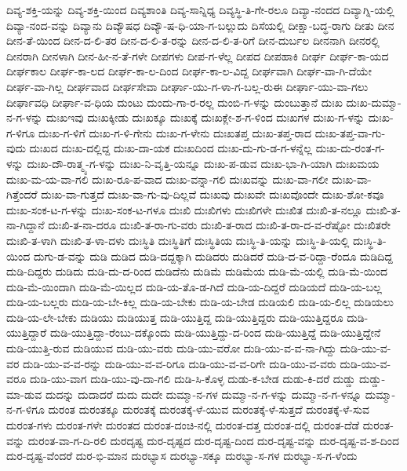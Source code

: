 {ದಿವ್ಯ-ಶಕ್ತಿ-ಯನ್ನು
ದಿವ್ಯ-ಶಕ್ತಿ-ಯಿಂದ
ದಿವ್ಯಶಾಂತಿ
ದಿವ್ಯ-ಸಾನ್ನಿಧ್ಯ
ದಿವ್ಯಸ್ಥಿ-ತಿ-ಗೇ-ರಲೂ
ದಿವ್ಯಾ-ನಂದದ
ದಿವ್ಯಾಗ್ನಿ-ಯಲ್ಲಿ
ದಿವ್ಯಾ-ನಂದ-ವನ್ನು
ದಿವ್ಯಾನು
ದಿವ್ಯೌಷಧ
ದಿವ್ಯೌ-ಷ-ಧಿ-ಯಾ-ಗ-ಬಲ್ಲುದು
ದಿಸೆಯಲ್ಲಿ
ದೀಕ್ಷಾ-ಬದ್ಧ-ರಾಗು
ದೀತು
ದೀನ
ದೀನ-ತೆ-ಯಿಂದ
ದೀನ-ದ-ಲಿ-ತರ
ದೀನ-ದ-ಲಿ-ತ-ರನ್ನು
ದೀನ-ದ-ಲಿ-ತ-ರಿಗೆ
ದೀನ-ದುರ್ಬಲ
ದೀನನಾಗಿ
ದೀನರಲ್ಲಿ
ದೀನರಾಗಿ
ದೀನಳಾಗಿ
ದೀನ-ಹೀ-ನ-ತೆ-ಗಳೇ
ದೀಪಗಳು
ದೀಪ-ಗ-ಳೆಲ್ಲ
ದೀಪದ
ದೀಪಹಾಕಿ
ದೀರ್ಘ
ದೀರ್ಘ-ಕಾ-ಯದ
ದೀರ್ಘಕಾಲ
ದೀರ್ಘ-ಕಾ-ಲದ
ದೀರ್ಘ-ಕಾ-ಲ-ದಿಂದ
ದೀರ್ಘ-ಕಾ-ಲ-ವಿದ್ದ
ದೀರ್ಘವಾಗಿ
ದೀರ್ಘ-ವಾ-ಗಿ-ದೆಯೇ
ದೀರ್ಘ-ವಾ-ಗಿಲ್ಲ
ದೀರ್ಘವಾದ
ದೀರ್ಘಸೇವಾ
ದೀರ್ಘಾ-ಯು-ಗ-ಳಾ-ಗ-ಬಲ್ಲ-ರುಈ
ದೀರ್ಘಾ-ಯು-ವಾ-ಗಲು
ದೀರ್ಘಾವಧಿ
ದೀರ್ಘಾ-ವ-ಧಿಯ
ದುಂಟು
ದುಂದು-ಗಾ-ರ-ರಲ್ಲ
ದುಂಬಿ-ಗ-ಳನ್ನು
ದುಂಬುತ್ತಾನೆ
ದುಃಖ
ದುಃಖ-ದುಮ್ಮಾ-ನ-ಗ-ಳನ್ನು
ದುಃಖಇವು
ದುಃಖಕ್ಕೀಡು
ದುಃಖಕ್ಕೂ
ದುಃಖಕ್ಕೆ
ದುಃಖಕ್ಲೇ-ಶ-ಗ-ಳಿಂದ
ದುಃಖಗಳ
ದುಃಖ-ಗ-ಳನ್ನು
ದುಃಖ-ಗ-ಳಿಗೂ
ದುಃಖ-ಗ-ಳಿಗೆ
ದುಃಖ-ಗ-ಳಿ-ಗೇನು
ದುಃಖ-ಗ-ಳೇನು
ದುಃಖತಪ್ತ
ದುಃಖ-ತಪ್ತ-ರಾದ
ದುಃಖ-ತಪ್ತ-ವಾ-ಗು-ವುದು
ದುಃಖದ
ದುಃಖ-ದಲ್ಲಿದ್ದ
ದುಃಖ-ದಾ-ಯಕ
ದುಃಖದಿಂದ
ದುಃಖ-ದು-ಗು-ಡ-ಗ-ಳನ್ನೆಲ್ಲ
ದುಃಖ-ದು-ರಂತ-ಗ-ಳನ್ನು
ದುಃಖ-ದೌ-ರಾತ್ಮ್ಯ-ಗ-ಳನ್ನು
ದುಃಖ-ನಿ-ವೃತ್ತಿ-ಯನ್ನೂ
ದುಃಖ-ಪ-ಡುವ
ದುಃಖ-ಭಾ-ಗಿ-ಯಾಗಿ
ದುಃಖಮಯ
ದುಃಖ-ಮ-ಯ-ವಾ-ಗಲಿ
ದುಃಖ-ರೂ-ಪ-ವಾದ
ದುಃಖ-ವನ್ನಾ-ಗಲಿ
ದುಃಖವನ್ನು
ದುಃಖ-ವಾ-ಗಲೀ
ದುಃಖ-ವಾ-ಗಿತ್ತೆಂದರೆ
ದುಃಖ-ವಾ-ಗುತ್ತದೆ
ದುಃಖ-ವಾ-ಗು-ವು-ದಿಲ್ಲವೆ
ದುಃಖವು
ದುಃಖವೇ
ದುಃಖವೊಂದೇ
ದುಃಖ-ಶೋ-ಕವೂ
ದುಃಖ-ಸಂಕ-ಟ-ಗ-ಳನ್ನು
ದುಃಖ-ಸಂಕ-ಟ-ಗಳೂ
ದುಃಖಿ
ದುಃಖಿಗಳು
ದುಃಖಿಗಳೇ
ದುಃಖಿತ
ದುಃಖಿ-ತ-ನಲ್ಲೂ
ದುಃಖಿ-ತ-ನಾ-ಗಿದ್ದಾನೆ
ದುಃಖಿ-ತ-ನಾ-ದರೂ
ದುಃಖಿ-ತ-ರಾ-ಗು-ವರು
ದುಃಖಿ-ತ-ರಾದ
ದುಃಖಿ-ತ-ರಾ-ದ-ವ-ರೆಷ್ಟೋ
ದುಃಖಿತರೇ
ದುಃಖಿ-ತ-ಳಾಗಿ
ದುಃಖಿ-ತ-ಳಾ-ದಳು
ದುಃಸ್ಥಿತಿ
ದುಃಸ್ಥಿತಿಗೆ
ದುಃಸ್ಥಿತಿಯ
ದುಃಸ್ಥಿ-ತಿ-ಯನ್ನು
ದುಃಸ್ಥಿ-ತಿ-ಯಲ್ಲಿ
ದುಃಸ್ಥಿ-ತಿ-ಯಿಂದ
ದುಗು-ಡ-ವನ್ನು
ದುಡಿ
ದುಡಿದ
ದುಡಿ-ದದ್ದಕ್ಕಾಗಿ
ದುಡಿದರು
ದುಡಿದರೆ
ದುಡಿ-ದ-ವ-ರಿದ್ದಾ-ರೆಂದೂ
ದುಡಿದಿದ್ದ
ದುಡಿ-ದಿದ್ದರು
ದುಡಿದು
ದುಡಿ-ದು-ದ-ರಿಂದ
ದುಡಿದೆನು
ದುಡಿಮೆ
ದುಡಿಮೆಯ
ದುಡಿ-ಮೆ-ಯಲ್ಲಿ
ದುಡಿ-ಮೆ-ಯಿಂದ
ದುಡಿ-ಮೆ-ಯಿಂದಾಗಿ
ದುಡಿ-ಮೆ-ಯಿಲ್ಲದ
ದುಡಿ-ಯ-ತೊ-ಡ-ಗಿದೆ
ದುಡಿ-ಯ-ದಿದ್ದರೆ
ದುಡಿಯದೆ
ದುಡಿ-ಯ-ಬಲ್ಲ
ದುಡಿ-ಯ-ಬಲ್ಲರು
ದುಡಿ-ಯ-ಬೇ-ಕಿಲ್ಲ
ದುಡಿ-ಯ-ಬೇಕು
ದುಡಿ-ಯ-ಬೇಡ
ದುಡಿಯಲಿ
ದುಡಿ-ಯ-ಲಿಲ್ಲ
ದುಡಿಯಲು
ದುಡಿ-ಯ-ಲೇ-ಬೇಕು
ದುಡಿಯು
ದುಡಿಯುತ್ತ
ದುಡಿ-ಯುತ್ತಿದ್ದ
ದುಡಿ-ಯುತ್ತಿದ್ದರು
ದುಡಿ-ಯುತ್ತಿದ್ದರೂ
ದುಡಿ-ಯುತ್ತಿದ್ದಾರೆ
ದುಡಿ-ಯುತ್ತಿದ್ದಾ-ರೆಂಬು-ದಕ್ಕೊಂದು
ದುಡಿ-ಯುತ್ತಿದ್ದು-ದ-ರಿಂದ
ದುಡಿ-ಯುತ್ತಿದ್ದೆ
ದುಡಿ-ಯುತ್ತಿದ್ದೇನೆ
ದುಡಿ-ಯುತ್ತಿ-ರುವ
ದುಡಿಯುವ
ದುಡಿ-ಯು-ವರು
ದುಡಿ-ಯು-ವರೋ
ದುಡಿ-ಯು-ವ-ವ-ನಾ-ಗಿದ್ದು
ದುಡಿ-ಯು-ವ-ವರ
ದುಡಿ-ಯು-ವ-ವ-ರನ್ನು
ದುಡಿ-ಯು-ವ-ವ-ರಿಗೂ
ದುಡಿ-ಯು-ವ-ವ-ರಿಗೇ
ದುಡಿ-ಯು-ವ-ವರು
ದುಡಿ-ಯು-ವ-ವರೂ
ದುಡಿ-ಯು-ವಾಗ
ದುಡಿ-ಯು-ವು-ದಾ-ಗಲಿ
ದುಡಿ-ಸಿ-ಕೊಳ್ಳ
ದುಡು-ಕ-ಬೇಡ
ದುಡು-ಕಿ-ದರೆ
ದುಡ್ಡು
ದುಡ್ಡು-ಮಾ-ಡುವ
ದುದನ್ನು
ದುದಾದರೆ
ದುದು
ದುದೇ
ದುಮ್ಮಾ-ನ-ಗಳ
ದುಮ್ಮಾ-ನ-ಗ-ಳನ್ನು
ದುಮ್ಮಾ-ನ-ಗ-ಳನ್ನೂ
ದುಮ್ಮಾ-ನ-ಗ-ಳಿಗೂ
ದುರಂತ
ದುರಂತಕ್ಕೂ
ದುರಂತಕ್ಕೆ
ದುರಂತಕ್ಕೆ-ಳೆ-ಯುವ
ದುರಂತಕ್ಕೆ-ಳೆ-ಸುತ್ತದೆ
ದುರಂತಕ್ಕೆ-ಳೆ-ಸುವ
ದುರಂತ-ಗಳು
ದುರಂತ-ಗಳೇ
ದುರಂತದ
ದುರಂತ-ದಂಚಿ-ನಲ್ಲಿ
ದುರಂತ-ದತ್ತ
ದುರಂತ-ದಲ್ಲಿ
ದುರಂತ-ದೆಡೆ
ದುರಂತ-ವನ್ನು
ದುರಂತ-ವಾ-ಗ-ದಿ-ರಲಿ
ದುರದೃಷ್ಟ
ದುರ-ದೃಷ್ಟದ
ದುರ-ದೃಷ್ಟ-ದಿಂದ
ದುರ-ದೃಷ್ಟ-ವನ್ನು
ದುರ-ದೃಷ್ಟ-ವ-ಶ-ದಿಂದ
ದುರ-ದೃಷ್ಟ-ವೆಂದರೆ
ದುರ-ಭಿ-ಮಾನ
ದುರಭ್ಯಾಸ
ದುರಭ್ಯಾ-ಸಕ್ಕೂ
ದುರಭ್ಯಾ-ಸ-ಗಳ
ದುರಭ್ಯಾ-ಸ-ಗ-ಳೆಂದು
}
